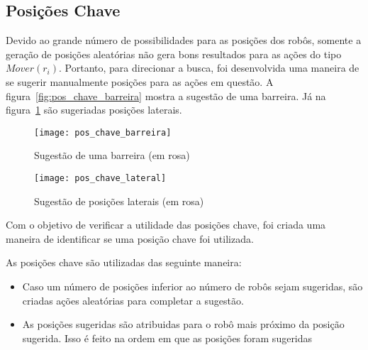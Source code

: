 \subsection{Posições Chave}\label{subsec:pos_chave}

Devido ao grande número de possibilidades para
as posições dos robôs, somente a geração de
posições aleatórias não gera bons resultados
para as ações do tipo $Mover(r_i)$. Portanto,
para direcionar a busca, foi desenvolvida uma
maneira de se sugerir manualmente posições para
as ações em questão. A figura~\ref{fig:pos_chave_barreira}
mostra a sugestão de uma barreira. Já na
figura~\ref{fig:pos_chave_lateral} são sugeriadas
posições laterais. 

\begin{figure}
  \centering
  \texttt{[image: pos\_chave\_barreira]}
  \caption{Sugestão de uma barreira (em rosa)}\label{fig:pos_chave_barreira}
  \texttt{[image: pos\_chave\_lateral]}
  \caption{Sugestão de posições laterais (em rosa)}\label{fig:pos_chave_lateral}
\end{figure}

Com o objetivo de verificar a utilidade das posições chave,
foi criada uma maneira de identificar se uma posição chave
foi utilizada.

As posições chave são utilizadas das seguinte maneira:
\begin{itemize}
  \item Caso um número de posições inferior ao número de
        robôs sejam sugeridas, são criadas ações aleatórias
        para completar a sugestão. 
  \item As posições sugeridas são atribuidas para o robô
        mais próximo da posição sugerida. Isso é feito
        na ordem em que as posições foram sugeridas
\end{itemize}
